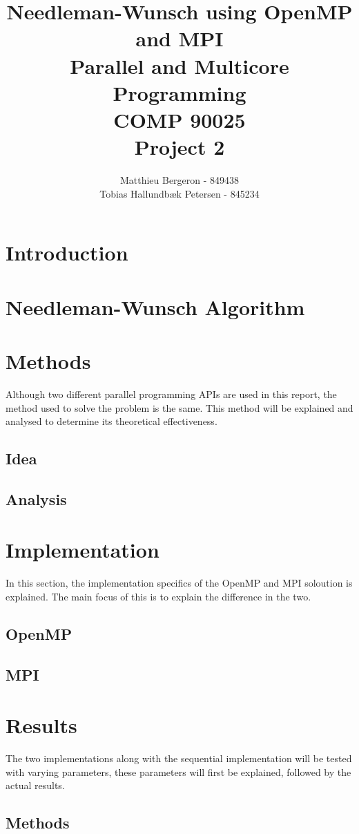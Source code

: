 \documentclass[a4paper]{article}
\title{Needleman-Wunsch using OpenMP and MPI\\Parallel and Multicore Programming\\COMP 90025\\Project 2}
\author{Matthieu Bergeron - 849438\\Tobias Hallundbæk Petersen - 845234}
\begin{document}
\maketitle
\section{Introduction}

\section{Needleman-Wunsch Algorithm}

\section{Methods}
Although two different parallel programming APIs are used in this report, the method used to solve the problem is the same. This method will be explained and analysed to determine its theoretical effectiveness.
\subsection{Idea}

\subsection{Analysis}

\section{Implementation}
In this section, the implementation specifics of the OpenMP and MPI soloution is explained. The main focus of this is to explain the difference in the two.
\subsection{OpenMP}

\subsection{MPI}

\section{Results}
The two implementations along with the sequential implementation will be tested with varying parameters, these parameters will first be explained, followed by the actual results.
\subsection{Methods}

\end{document}
